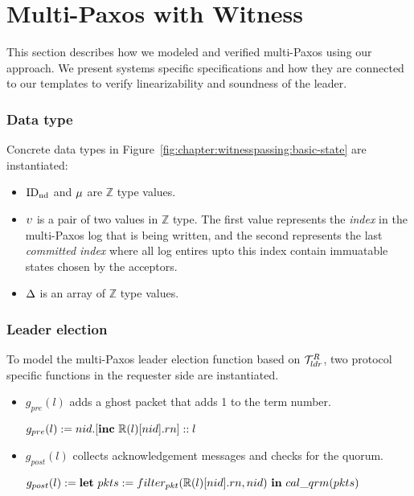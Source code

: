 
\section{Multi-Paxos with Witness}
\label{chapter:witnesspassing:sec:multipaxos-with-witness}


This section describes how we modeled and verified multi-Paxos using 
our approach. We present  systems specific specifications and how they
are connected to our templates to verify linearizability and soundness
of the leader. 

\subsubsection{Data type}

Concrete data types in Figure~\ref{fig:chapter:witnesspassing:basic-state} are instantiated:
\begin{itemize}
\item $\mathrm{ID_{nd}}$ and $\mu$ are $\mathbb{Z}$ type values.
\item $\upsilon$ is a pair of two values in $\mathbb{Z}$ type. The first value represents 
the \textit{index} in the multi-Paxos log that is being written, and the 
second represents the last \textit{committed index} where all log entires upto this
index contain immuatable states chosen by the acceptors.
\item $\Delta$ is an array of $\mathbb{Z}$ type values.
\end{itemize}

\subsubsection{Leader election}
To model the multi-Paxos leader election function based on $\mathcal{T}^{R}_{ldr}$,
two protocol specific functions in the requester side are instantiated.
\begin{itemize}
\item $g_{pre} (l)$ adds a ghost packet that adds 1 to the term number.
\begin{center}
$g_{pre} (l) := nid.[\mbox{\textbf{inc}} \ \replay(l)[nid].rn]::l$
\end{center}
\item $g_{post} (l)$ collects acknowledgement messages and checks for the
	quorum.
	\begin{center}
$g_{post} (l) := \mbox{\textbf{let}}\ pkts := filter_{pkt}(\replay(l)[nid].rn, nid)\ \mbox{\textbf{in}} \ cal\_qrm(pkts)$
\end{center}
\end{itemize}

